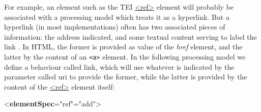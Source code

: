 For example, an element such as the TEI \hyperref[TEI.ref]{<ref>} element will probably be associated with a processing model which treats it as a hyperlink. But a hyperlink (in most implementations) often has two associated pieces of information: the address indicated, and some textual content serving to label the link . In HTML, the former is provided as value of the {\itshape href} element, and the latter by the content of an \texttt{<a>} element. In the following processing model we define a behaviour called \textsf{link}, which will use whatever is indicated by the parameter called \textsf{uri}  to provide the former, while the latter is provided by the content of the \hyperref[TEI.ref]{<ref>} element itself: \par\bgroup{}\exampleFont \begin{shaded}\noindent\mbox{}{<\textbf{elementSpec}\hspace*{1em}{ident}="{ref}"\hspace*{1em}{mode}="{add}">}\mbox{}\newline 
{}\mbox{}\newline 
\hspace*{1em}\mbox{}\newline 
\hspace*{1em}\mbox{}\newline 
{}\mbox{}\newline 

\end{shaded}
